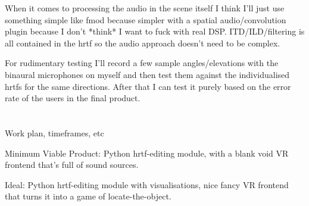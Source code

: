 \documentclass[10pt, oneside, a4paper, draft]{scrartcl}
\begin{document}
When it comes to processing the audio in the scene itself I think I'll just use something simple like fmod because simpler with a spatial audio/convolution plugin because I don't *think* I want to fuck with real DSP. ITD/ILD/filtering is all contained in the hrtf so the audio approach doesn't need to be complex. 

For rudimentary testing I'll record a few sample angles/elevations with the binaural microphones on myself and then test them against the individualised hrtfs for the same directions. After that I can test it purely based on the error rate of the users in the final product. 

\section*{}
Work plan, timeframes, etc

Minimum Viable Product: 
Python hrtf-editing module, with a blank void VR frontend that's full of sound sources. 

Ideal:
Python hrtf-editing module with visualisations, nice fancy VR frontend that turns it into a game of locate-the-object.
\end{document}
